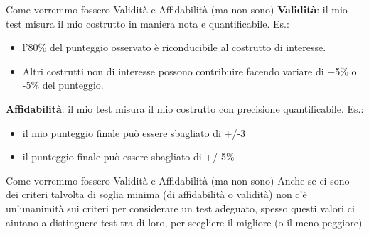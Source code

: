 \documentclass[
  ignorenonframetext,
  aspectratio=169,
]{beamer}
\providecommand{\tightlist}{%
  \setlength{\itemsep}{0pt}\setlength{\parskip}{0pt}}
\begin{document}
\begin{frame}{Come vorremmo fossero Validità e Affidabilità (ma non
sono)}
\label{come-vorremmo-fossero-validituxe0-e-affidabilituxe0-ma-non-sono}
\textbf{Validità}: il mio test misura il mio costrutto in maniera nota e
quantificabile. Es.:

\begin{itemize}
\tightlist
\item
  l'80\% del punteggio osservato è riconducibile al costrutto di
  interesse.
\item
  Altri costrutti non di interesse possono contribuire facendo variare
  di +5\% o -5\% del punteggio.
\end{itemize}

\vfill
\pause

\textbf{Affidabilità}: il mio test misura il mio costrutto con
precisione quantificabile. Es.:

\begin{itemize}
\tightlist
\item
  il mio punteggio finale può essere sbagliato di +/-3
\item
  il punteggio finale può essere sbagliato di +/-5\%
\end{itemize}
\end{frame}

\begin{frame}{Come vorremmo fossero Validità e Affidabilità (ma non
sono)}
\label{come-vorremmo-fossero-validituxe0-e-affidabilituxe0-ma-non-sono-1}
Anche se ci sono dei criteri talvolta di soglia minima (di affidabilità
o validità) non c'è un'unanimità sui criteri per considerare un test
adeguato, spesso questi valori ci aiutano a distinguere test tra di
loro, per scegliere il migliore (o il meno peggiore)

\vfill

\begin{center}
\end{center}
\end{frame}
\end{document}
